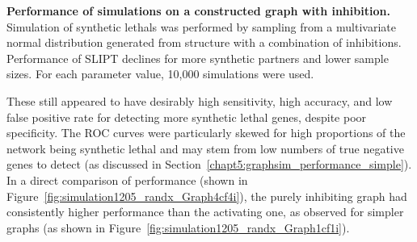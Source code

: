 \begin{figure*}[!htbp\]
         \begin{center}
%
        \subcaptionbox{Statistical evaluation}{%
            \label{fig:simulation1205_randx_Graph4i2ROC:Perf}
            \texttt{[image: \{"/home/tomkelly/Documents/PhD Otago Uni/SL\_Model/RUN\_20161205\_randx/SL\_Model\_Test\_Graph\_10K\_Graph4i2\_ROC1\_samplesx".png]}}
        }%
        \subcaptionbox{\gls{ROC} curves}{%
            \label{fig:simulation1205_randx_Graph4i2ROC:ROC}
            \texttt{[image: \{"/home/tomkelly/Documents/PhD Otago Uni/SL\_Model/RUN\_20161205\_randx/SL\_Model\_Test\_Graph\_10K\_Graph4i2\_ROC2\_samplesx".png]}}
        }%
        
        \subcaptionbox{Graph structure}{%
           \label{fig:simulation1205_randx_Graph4i2}
           \raisebox{0.1875\textwidth}{
           \texttt{[image: \{"/home/tomkelly/Documents/PhD Otago Uni/SL\_Model/Graph4i2".pdf]}}
           }
        }%
        \subcaptionbox{Statistical performance}{%
           \label{fig:simulation1205_randx_Graph4i2ROC:AUC}
           \texttt{[image: \{"/home/tomkelly/Documents/PhD Otago Uni/SL\_Model/RUN\_20161205\_randx/SL\_Model\_Test\_Graph\_10K\_Graph4i2\_AUC\_samplesx".png]}}
        }%
    \end{center}
   \caption[Performance of simulations on a constructed graph with inhibition]{\small \textbf{Performance of simulations on a constructed graph with inhibition.} Simulation of \glspl{synthetic lethal} was performed by sampling from a multivariate normal distribution generated from   structure with a combination of inhibitions. Performance of \gls{SLIPT} declines for more synthetic partners and lower sample sizes. For each parameter value, 10,000 simulations were used.}
\label{fig:simulation1205_randx_Graph4i2}
\end{figure*}

These still appeared to have desirably high sensitivity, high accuracy, and low false positive rate for detecting more \gls{synthetic lethal} genes, despite poor specificity. The \gls{ROC} curves were particularly skewed for high proportions of the network being \gls{synthetic lethal} and may stem from low numbers of true negative genes to detect (as discussed in Section~\ref{chapt5:graphsim_performance_simple}). In a direct comparison of performance (shown in Figure~\ref{fig:simulation1205_randx_Graph4cf4i}), the purely inhibiting graph had consistently higher performance than the activating one, as observed for simpler \glspl{graph} (as shown in Figure~\ref{fig:simulation1205_randx_Graph1cf1i}).

